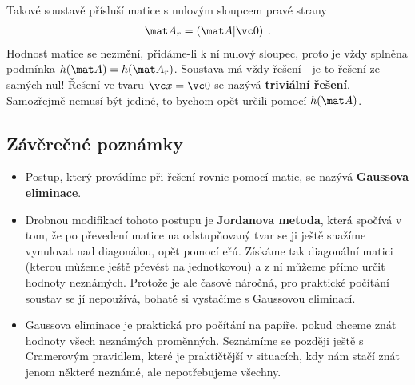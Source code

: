 Takové soustavě přísluší matice s nulovým sloupcem pravé strany \begin{align}
    \mat A_r = \left( \mat A | \vc 0 \right) \:.
\end{align}
Hodnost matice se nezmění, přidáme-li k ní nulový sloupec, proto je vždy splněna podmínka $h(\mat A) = h(\mat A_r)$. Soustava má vždy řešení - je to řešení ze samých nul! Řešení ve tvaru $\vc x = \vc 0$ se nazývá \textbf{triviální řešení}. Samozřejmě nemusí být jediné, to bychom opět určili pomocí $h(\mat A)$.


\subsection*{Závěrečné poznámky}
\begin{itemize}
    \item Postup, který provádíme při řešení rovnic pomocí matic, se nazývá \textbf{Gaussova eliminace}.
    \item Drobnou modifikací tohoto postupu je \textbf{Jordanova metoda}, která spočívá v tom, že po převedení matice na odstupňovaný tvar se ji ještě snažíme vynulovat nad diagonálou, opět pomocí eřú. Získáme tak diagonální matici (kterou můžeme ještě převést na jednotkovou) a z ní můžeme přímo určit hodnoty neznámých. Protože je ale časově náročná, pro praktické počítání soustav se jí nepoužívá, bohatě si vystačíme s Gaussovou eliminací.
    \item Gaussova eliminace je praktická pro počítání na papíře, pokud chceme znát hodnoty všech neznámých proměnných. Seznámíme se později ještě s Cramerovým pravidlem, které je praktičtější v situacích, kdy nám stačí znát jenom některé neznámé, ale nepotřebujeme všechny.
\end{itemize}
